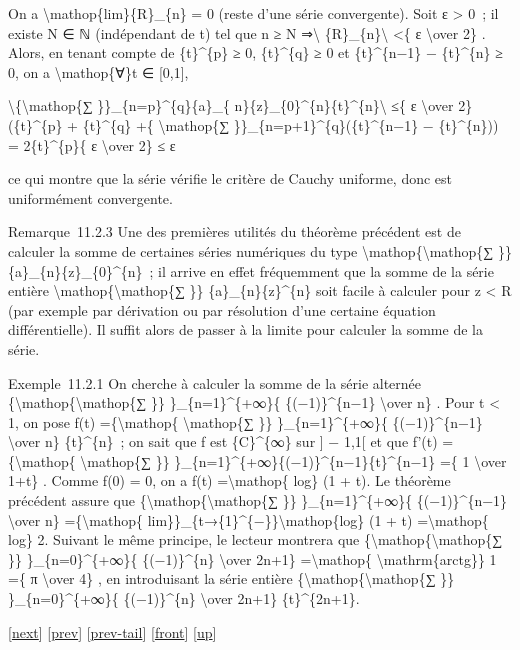 \documentclass[]{article}
\begin{document}
On a \textbackslash{}mathop\{lim\}\{R\}\_\{n\} = 0 (reste d'une série
convergente). Soit ε \textgreater{} 0~; il existe N ∈ ℕ (indépendant de
t) tel que n ≥ N ⇒\textbackslash{}\textbar{}
\{R\}\_\{n\}\textbackslash{}\textbar{} \textless{}\{ ε
\textbackslash{}over 2\} . Alors, en tenant compte de \{t\}\^{}\{p\} ≥
0, \{t\}\^{}\{q\} ≥ 0 et \{t\}\^{}\{n−1\} − \{t\}\^{}\{n\} ≥ 0, on a
\textbackslash{}mathop\{∀\}t ∈ {[}0,1{]},

\textbackslash{}\textbar{}\{\textbackslash{}mathop\{∑
\}\}\_\{n=p\}\^{}\{q\}\{a\}\_\{
n\}\{z\}\_\{0\}\^{}\{n\}\{t\}\^{}\{n\}\textbackslash{}\textbar{} ≤\{ ε
\textbackslash{}over 2\} (\{t\}\^{}\{p\} + \{t\}\^{}\{q\} +\{
\textbackslash{}mathop\{∑ \}\}\_\{n=p+1\}\^{}\{q\}(\{t\}\^{}\{n−1\} −
\{t\}\^{}\{n\})) = 2\{t\}\^{}\{p\}\{ ε \textbackslash{}over 2\} ≤ ε

ce qui montre que la série vérifie le critère de Cauchy uniforme, donc
est uniformément convergente.

Remarque~11.2.3 Une des premières utilités du théorème précédent est de
calculer la somme de certaines séries numériques du type
\textbackslash{}mathop\{\textbackslash{}mathop\{∑ \}\}
\{a\}\_\{n\}\{z\}\_\{0\}\^{}\{n\}~; il arrive en effet fréquemment que
la somme de la série entière
\textbackslash{}mathop\{\textbackslash{}mathop\{∑ \}\}
\{a\}\_\{n\}\{z\}\^{}\{n\} soit facile à calculer pour
\textbar{}z\textbar{} \textless{} R (par exemple par dérivation ou par
résolution d'une certaine équation différentielle). Il suffit alors de
passer à la limite pour calculer la somme de la série.

Exemple~11.2.1 On cherche à calculer la somme de la série alternée
\{\textbackslash{}mathop\{\textbackslash{}mathop\{∑ \}\}
\}\_\{n=1\}\^{}\{+∞\}\{ \{(−1)\}\^{}\{n−1\} \textbackslash{}over n\} .
Pour \textbar{}t\textbar{} \textless{} 1, on pose f(t)
=\{\textbackslash{}mathop\{ \textbackslash{}mathop\{∑ \}\}
\}\_\{n=1\}\^{}\{+∞\}\{ \{(−1)\}\^{}\{n−1\} \textbackslash{}over n\}
\{t\}\^{}\{n\}~; on sait que f est \{C\}\^{}\{∞\} sur {]} − 1,1{[} et
que f'(t) =\{\textbackslash{}mathop\{ \textbackslash{}mathop\{∑ \}\}
\}\_\{n=1\}\^{}\{+∞\}\{(−1)\}\^{}\{n−1\}\{t\}\^{}\{n−1\} =\{ 1
\textbackslash{}over 1+t\} . Comme f(0) = 0, on a f(t)
=\textbackslash{}mathop\{ log\} (1 + t). Le théorème précédent assure
que \{\textbackslash{}mathop\{\textbackslash{}mathop\{∑ \}\}
\}\_\{n=1\}\^{}\{+∞\}\{ \{(−1)\}\^{}\{n−1\} \textbackslash{}over n\}
=\{\textbackslash{}mathop\{
lim\}\}\_\{t→\{1\}\^{}\{−\}\}\textbackslash{}mathop\{log\} (1 + t)
=\textbackslash{}mathop\{ log\} 2. Suivant le même principe, le lecteur
montrera que \{\textbackslash{}mathop\{\textbackslash{}mathop\{∑ \}\}
\}\_\{n=0\}\^{}\{+∞\}\{ \{(−1)\}\^{}\{n\} \textbackslash{}over 2n+1\}
=\textbackslash{}mathop\{ \textbackslash{}mathrm\{arctg\}\} 1 =\{ π
\textbackslash{}over 4\} , en introduisant la série entière
\{\textbackslash{}mathop\{\textbackslash{}mathop\{∑ \}\}
\}\_\{n=0\}\^{}\{+∞\}\{ \{(−1)\}\^{}\{n\} \textbackslash{}over 2n+1\}
\{t\}\^{}\{2n+1\}.

{[}\href{coursse65.html}{next}{]} {[}\href{coursse63.html}{prev}{]}
{[}\href{coursse63.html\#tailcoursse63.html}{prev-tail}{]}
{[}\href{coursse64.html}{front}{]}
{[}\href{coursch12.html\#coursse64.html}{up}{]}
\end{document}
